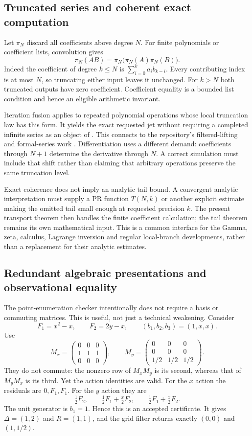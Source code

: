 \subsection{Truncated series and coherent exact computation}

Let $\pi_N$ discard all coefficients above degree $N$. For finite
polynomials or coefficient lists, convolution gives
\[
      \pi_N(AB)=\pi_N\bigl(\pi_N(A)\pi_N(B)\bigr).
\]
Indeed the coefficient of degree $k\le N$ is
$\sum_{i=0}^{k}a_i b_{k-i}$. Every contributing index is at most
$N$, so truncating either input leaves it unchanged. For $k>N$
both truncated outputs have zero coefficient. Coefficient equality
is a bounded list condition and hence an eligible arithmetic invariant.

Iteration fusion applies to repeated polynomial operations whose local
truncation law has this form. It yields the exact requested jet without
requiring a completed infinite series as an object of \ipra. This
connects to the repository's filtered-lifting and formal-series work
\cite{Coherent}. Differentiation uses a different demand: coefficients
through $N+1$ determine the derivative through $N$. A correct
simulation must include that shift rather than claiming that arbitrary
operations preserve the same truncation level.

Exact coherence does not imply an analytic tail bound. A convergent
analytic interpretation must supply a PR function $T(N,k)$ or another
explicit estimate making the omitted tail small enough at requested
precision $k$. The present transport theorem then handles the finite
coefficient calculation; the tail theorem remains its own mathematical
input. This is a common interface for the Gamma, zeta, calculus,
Lagrange inversion and regular local-branch developments, rather than
a replacement for their analytic estimates.

\subsection{Redundant algebraic presentations and observational equality}

The point-enumeration checker intentionally does not require a basis or
commuting matrices. This is useful, not just a technical weakening.
Consider
\[
 F_1=x^2-x,\qquad F_2=2y-x,\qquad (b_1,b_2,b_3)=(1,x,x).
\]
Use
\[
 M_x=\begin{pmatrix}0&0&0\\1&1&1\\0&0&0\end{pmatrix},
 \qquad
 M_y=\begin{pmatrix}0&0&0\\0&0&0\\1/2&1/2&1/2\end{pmatrix}.
\]
They do not commute: the nonzero row of $M_xM_y$ is its second,
whereas that of $M_yM_x$ is its third. Yet the action identities
are valid. For the $x$ action the residuals are $0,F_1,F_1$.
For the $y$ action they are
\[
 \tfrac12F_2,\qquad
 \tfrac12F_1+\tfrac x2F_2,\qquad
 \tfrac12F_1+\tfrac x2F_2.
\]
The unit generator is $b_1=1$. Hence this is an accepted certificate.
It gives $\Delta=(1,2)$ and $R=(1,1)$, and the grid filter returns
exactly $(0,0)$ and $(1,1/2)$.

